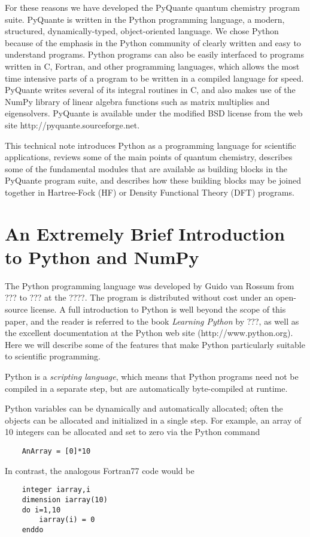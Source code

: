 \documentclass[twocolumn]{revtex4}
\begin{document}
For these reasons we have developed the PyQuante quantum chemistry
program suite. PyQuante is written in the Python programming language,
a modern, structured, dynamically-typed, object-oriented language. We
chose Python because of the emphasis in the Python community of
clearly written and easy to understand programs. Python programs can
also be easily interfaced to programs written in C, Fortran, and other
programming languages, which allows the most time intensive parts of a
program to be written in a compiled language for speed. PyQuante
writes several of its integral routines in C, and also makes
use of the NumPy library of linear algebra functions such as matrix
multiplies and eigensolvers. PyQuante is available under the modified 
BSD license from the web site http://pyquante.sourceforge.net. 

This technical note introduces Python as a programming language for
scientific applications, reviews some of the main points of quantum
chemistry, describes some of the fundamental modules that are
available as building blocks in the PyQuante program suite, and
describes how these building blocks may be joined together in
Hartree-Fock (HF) or Density Functional Theory (DFT) programs. 

\section{An Extremely Brief Introduction to Python and NumPy}
The Python programming language was developed by Guido van Rossum from
??? to ??? at the ????. The program is distributed without cost under
an open-source license. A full introduction to Python is well beyond
the scope of this paper, and the reader is referred to the book
\emph{Learning Python} by ???, as well as the excellent documentation
at the Python web site (http://www.python.org). Here we will describe
some of the features that make Python particularly suitable to
scientific programming.

Python is a \emph{scripting language}, which means that Python
programs need not be compiled in a separate step, but are
automatically byte-compiled at runtime. 

Python variables can be dynamically and automatically allocated; often
the objects can be allocated and initialized in a single step. For
example, an array of 10 integers can be allocated and set to zero via
the Python command
\begin{verbatim}
    AnArray = [0]*10
\end{verbatim}
In contrast, the analogous Fortran77 code would be
\begin{verbatim}
    integer iarray,i
    dimension iarray(10)
    do i=1,10
        iarray(i) = 0
    enddo
\end{verbatim}
\end{document}
